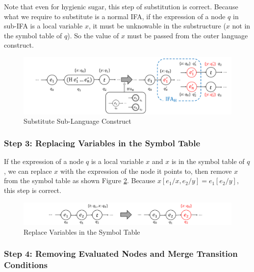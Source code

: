 Note that even for hygienic sugar, this step of substitution is correct. Because what we require to substitute is a normal IFA, if the expression of a node $q$ in sub-IFA is a local variable $x$, it must be unknowable in the substructure ($x$ not in the symbol table of $q$). So the value of $x$ must be passed from the outer language construct.

\begin{figure}[t]
    \centering
    \includegraphics[scale=0.25]{images/nmlifa/nmlifa-subst.png}
    \caption{Substitute Sub-Language Construct}
    \label{fig:nmlifa-subst}
\end{figure}

\subsubsection*{Step 3: Replacing Variables in the Symbol Table}

If the expression of a node $q$ is a local variable $x$ and $x$ is in the symbol table of $q$, we can replace $x$ with the expression of the node it points to, then remove $x$ from the symbol table as shown Figure \ref{fig:nmlifa-replace}. Because $x[e_1/x, e_2/y]=e_1[e_2/y]$, this step is correct.

\begin{figure}[t]
    \centering
    \includegraphics[scale=0.25]{images/nmlifa/nmlifa-replace.png}
    \caption{Replace Variables in the Symbol Table}
    \label{fig:nmlifa-replace}
\end{figure}

\subsubsection*{Step 4: Removing Evaluated Nodes and Merge Transition Conditions}

